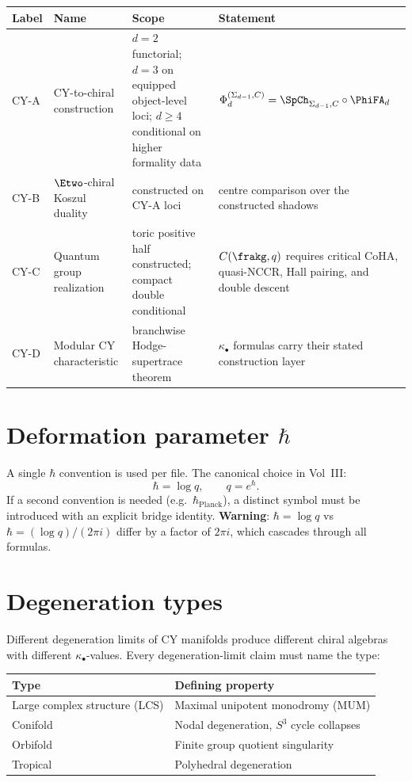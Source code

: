 \begin{center}
\begin{tabular}{@{}llll@{}}
\toprule
\textbf{Label} & \textbf{Name} & \textbf{Scope} & \textbf{Statement} \\
\midrule
CY-A & CY-to-chiral construction & $d=2$ functorial; $d=3$ on equipped object-level loci; $d \geq 4$ conditional on higher formality data &
 $\Phi_d^{(\Sigma_{d-1},C)}=\SpCh_{\Sigma_{d-1},C}\circ\PhiFA_d$ \\
CY-B & $\Etwo$-chiral Koszul duality & constructed on CY-A loci &
 centre comparison over the constructed shadows \\
CY-C & Quantum group realization & toric positive half constructed; compact double conditional &
 $C(\frakg,q)$ requires critical CoHA, quasi-NCCR, Hall pairing, and double descent \\
CY-D & Modular CY characteristic & branchwise Hodge-supertrace theorem &
 $\kappa_\bullet$ formulas carry their stated construction layer \\
\bottomrule
\end{tabular}
\end{center}

\section{Deformation parameter \texorpdfstring{$\hbar$}{hbar}}
\label{sec:nc-hbar}

A single $\hbar$ convention is used per file. The
canonical choice in Vol~III:
\[
 \hbar = \log q, \qquad q = e^\hbar.
\]
If a second convention is needed (e.g.\ $\hbar_{\mathrm{Planck}}$),
a distinct symbol must be introduced with an explicit bridge
identity.
\textbf{Warning}: $\hbar = \log q$ vs $\hbar = (\log q)/(2\pi i)$
differ by a factor of $2\pi i$, which cascades through all formulas.

\section{Degeneration types}
\label{sec:nc-degen}

Different degeneration limits of CY manifolds produce different
chiral algebras with different $\kappa_\bullet$-values.
Every degeneration-limit claim must name the type:

\begin{center}
\begin{tabular}{@{}ll@{}}
\toprule
\textbf{Type} & \textbf{Defining property} \\
\midrule
Large complex structure (LCS) & Maximal unipotent monodromy (MUM) \\
Conifold & Nodal degeneration, $S^3$ cycle collapses \\
Orbifold & Finite group quotient singularity \\
Tropical & Polyhedral degeneration \\
\bottomrule
\end{tabular}
\end{center}
